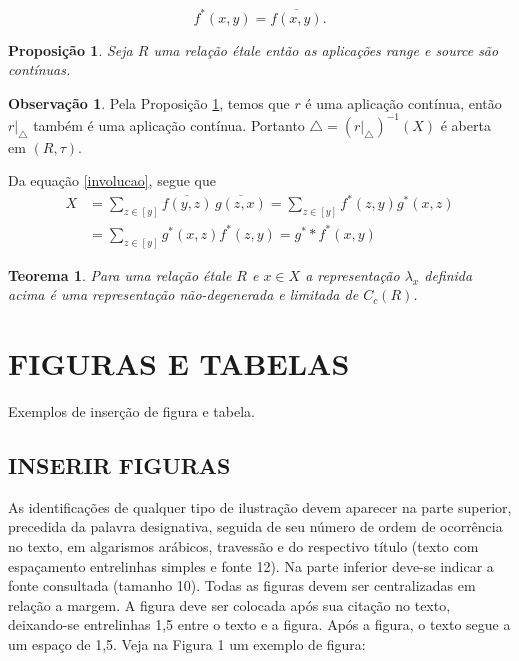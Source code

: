 \documentclass[
	12pt,				%
	oneside,			%
	a4paper,			%
	english,			%
	french,				%
	spanish,			%
	brazil,				%
	]{abntex2}
\theoremstyle{plain}
\newtheorem{teo}{Teorema}[chapter]
\newtheorem{prop}{Proposição}[chapter]
\theoremstyle{definition}
\newtheorem{obs}{Observação}[chapter]
\begin{document}
\begin{equation}\label{involucao} 
f^*(x,y)= \overline{f(x,y)}.
\end{equation}


\begin{prop}\label{continuas}
Seja $R$ uma relação étale então as aplicações range e source são contínuas.
\end{prop}


\begin{obs} 
Pela Proposição \ref{continuas}, temos que $r$ é uma aplicação contínua, então $r|_{\bigtriangleup}$ também é uma aplicação contínua. Portanto $\bigtriangleup = \left(r|_{\bigtriangleup}\right) ^{-1}(X)$ é aberta em $(R, \tau)$.
\end{obs}


Da equação \ref{involucao}, segue que
\begin{align*}  
        X & = \sum_{z \in [y]}\overline{f(y,z)}\,\overline{g(z,x)}= \sum_{z \in [y]} f^*(z,y)g^*(x,z)\\
          & = \sum_{z\in [y]}g^*(x,z)f^*(z,y) = g^* \ast f^* (x,y)
\end{align*}


\begin{teo}
Para uma relação étale $R$ e  $x \in X$ a representação  $\lambda_x$ definida acima é uma representação não-degenerada e limitada de $C_c(R)$.
\end{teo}




\chapter{FIGURAS E TABELAS}

Exemplos de inserção de figura e tabela.

\section{INSERIR FIGURAS}

As identificações de qualquer tipo de ilustração devem aparecer na parte superior, precedida da palavra designativa, seguida de seu número de ordem de ocorrência no texto, em algarismos arábicos, travessão e do respectivo título (texto com espaçamento entrelinhas simples e fonte 12). Na parte inferior deve-se indicar a fonte consultada (tamanho 10). Todas as figuras devem ser centralizadas em relação a margem. A figura deve ser colocada após sua citação no texto, deixando-se entrelinhas 1,5 entre o texto e a figura. Após a figura, o texto segue a um espaço de 1,5. Veja na Figura 1 um exemplo de figura:
\end{document}
